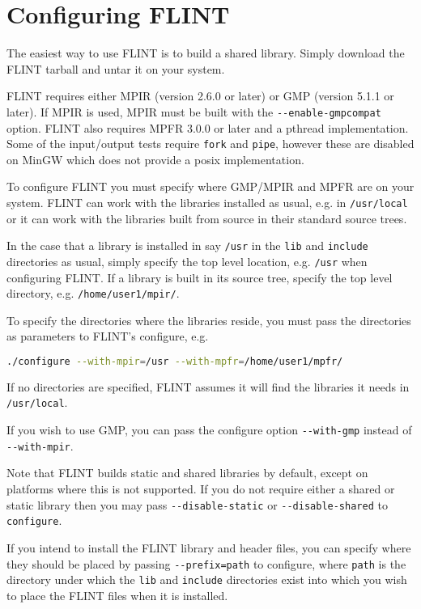 \documentclass[a4paper,10pt]{book}
\newcommand{\code}{\lstinline}
\begin{document}
\chapter{Configuring FLINT}

The easiest way to use FLINT is to build a shared library.  Simply download
the FLINT tarball and untar it on your system.

FLINT requires either MPIR (version 2.6.0 or later) or GMP
(version 5.1.1 or later). If MPIR is used, MPIR must be built with
the \code{--enable-gmpcompat} option. FLINT also requires
MPFR 3.0.0 or later and a pthread implementation.
Some of the input/output tests require
\code{fork} and \code{pipe}, however these are disabled on MinGW which
does not provide a posix implementation.

To configure FLINT you must specify where GMP/MPIR and MPFR are on
your system. FLINT can work with the libraries installed as usual,
e.g. in \code{/usr/local} or it can work with the libraries built
from source in their standard source trees.

In the case that a library is installed in say \code{/usr}
in the \code{lib} and \code{include} directories as usual, simply
specify the top level location, e.g. \code{/usr} when
configuring FLINT. If a library is built in its source tree,
specify the top level directory, e.g.
\code{/home/user1/mpir/}.

To specify the directories where the libraries reside, you must
pass the directories as parameters to FLINT's configure, e.g.\
\begin{lstlisting}[language=bash]
./configure --with-mpir=/usr --with-mpfr=/home/user1/mpfr/
\end{lstlisting}
If no directories are specified, FLINT assumes it will find the
libraries it needs in \code{/usr/local}.

If you wish to use GMP, you can pass the configure option
\code{--with-gmp} instead of \code{--with-mpir}.

Note that FLINT builds static and shared libraries by default, except
on platforms where this is not supported. If you do not require either
a shared or static library then you may pass \code{--disable-static}
or \code{--disable-shared} to \code{configure}.

If you intend to install the FLINT library and header files,
you can specify where they should be placed by passing
\code{--prefix=path} to configure, where \code{path} is the directory
under which the \code{lib} and \code{include} directories exist into
which you wish to place the FLINT files when it is installed.
\end{document}
